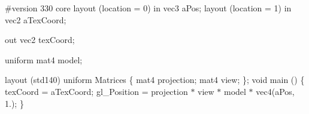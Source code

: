 \#version 330 core layout (location = 0) in vec3 a\+Pos; layout (location = 1) in vec2 a\+Tex\+Coord;

out vec2 tex\+Coord;

uniform mat4 model;

layout (std140) uniform Matrices \{ mat4 projection; mat4 view; \}; void main () \{ tex\+Coord = a\+Tex\+Coord; gl\+\_\+\+Position = projection $\ast$ view $\ast$ model $\ast$ vec4(a\+Pos, 1.); \} 